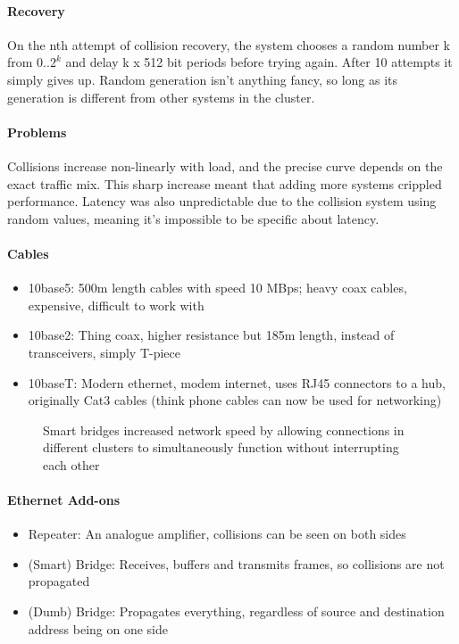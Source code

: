 \paragraph{Recovery}
On the nth attempt of collision recovery, the system chooses a random number k from ${0..2^k}$ and delay k x 512 bit periods before trying again. After 10 attempts it simply gives up. Random generation isn't anything fancy, so long as its generation is different from other systems in the cluster.
\paragraph{Problems}
Collisions increase non-linearly with load, and the precise curve depends on the exact traffic mix. This sharp increase meant that adding more systems crippled performance. Latency was also unpredictable due to the collision system using random values, meaning it's impossible to be specific about latency.
\paragraph{Cables}
\begin{itemize}
	\item 10base5: 500m length cables with speed 10 MBps; heavy coax cables, expensive, difficult to work with
	\item 10base2: Thing coax, higher resistance but 185m length, instead of transceivers, simply T-piece
	\item 10baseT: Modern ethernet, modem internet, uses RJ45 connectors to a hub, originally Cat3 cables (think phone cables can now be used for networking)
\end{itemize}
   \begin{figure}[!htb]
	\caption{\label{fig:smartbridge} Smart bridges increased network speed by allowing connections in different clusters to simultaneously function without interrupting each other}
\end{figure}
\paragraph{Ethernet Add-ons}
\begin{itemize}
	\item Repeater: An analogue amplifier, collisions can be seen on both sides
	\item (Smart) Bridge: Receives, buffers and transmits frames, so collisions are not propagated
	\item (Dumb) Bridge: Propagates everything, regardless of source and destination address being on one side
\end{itemize}
